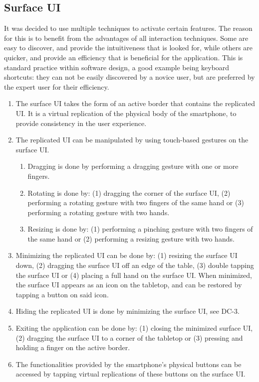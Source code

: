 \subsection{Surface UI}

It was decided to use multiple techniques to activate certain features.
The reason for this is to benefit from the advantages of all interaction techniques.
Some are easy to discover, and provide the intuitiveness that is looked for, while others are quicker, and provide an efficiency that is beneficial for the application.
This is standard practice within software design, a good example being keyboard shortcuts: they can not be easily discovered by a novice user, but are preferred by the expert user for their efficiency.

\begin{enumerate}[{DC}-1]
\item The surface UI takes the form of an active border that contains the replicated UI.
It is a virtual replication of the physical body of the smartphone, to provide consistency in the user experience.
\item The replicated UI can be manipulated by using touch-based gestures on the surface UI.
	\begin{enumerate}[{DC-2}a]
	\item Dragging is done by performing a dragging gesture with one or more fingers.
	\item Rotating is done by: (1) dragging the corner of the surface UI, (2) performing a rotating gesture with two fingers of the same hand or (3) performing a rotating gesture with two hands.
	\item Resizing is done by: (1) performing a pinching gesture with two fingers of the same hand or (2) performing a resizing gesture with two hands.
	\end{enumerate}
\item Minimizing the replicated UI can be done by: (1) resizing the surface UI down, (2) dragging the surface UI off an edge of the table, (3) double tapping the surface UI or (4) placing a full hand on the surface UI.
When minimized, the surface UI appears as an icon on the tabletop, and can be restored by tapping a button on said icon.
\item Hiding the replicated UI is done by minimizing the surface UI, see DC-3.
\item Exiting the application can be done by: (1) closing the minimized surface UI, (2) dragging the surface UI to a corner of the tabletop or (3) pressing and holding a finger on the active border.
\item The functionalities provided by the smartphone's physical buttons can be accessed by tapping virtual replications of these buttons on the surface UI.
\end{enumerate}

